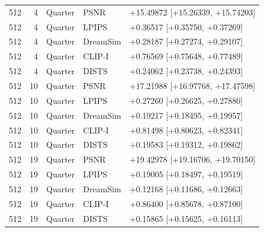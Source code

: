 \documentclass[10pt,letterpaper]{article}
\begin{document}
\begin{longtable}{@{}rrlll@{}}
512 & 4 & Quarter & PSNR & +15.49872 [+15.26339, +15.74203]\\
512 & 4 & Quarter & LPIPS & +0.36517 [+0.35750, +0.37269]\\
512 & 4 & Quarter & DreamSim & +0.28187 [+0.27274, +0.29107]\\
512 & 4 & Quarter & CLIP-I & +0.76569 [+0.75648, +0.77489]\\
512 & 4 & Quarter & DISTS & +0.24062 [+0.23738, +0.24393]\\
512 & 10 & Quarter & PSNR & +17.21988 [+16.97768, +17.47598]\\
512 & 10 & Quarter & LPIPS & +0.27260 [+0.26625, +0.27880]\\
512 & 10 & Quarter & DreamSim & +0.19217 [+0.18495, +0.19957]\\
512 & 10 & Quarter & CLIP-I & +0.81498 [+0.80623, +0.82341]\\
512 & 10 & Quarter & DISTS & +0.19583 [+0.19312, +0.19862]\\
512 & 19 & Quarter & PSNR & +19.42978 [+19.16706, +19.70150]\\
512 & 19 & Quarter & LPIPS & +0.19005 [+0.18497, +0.19519]\\
512 & 19 & Quarter & DreamSim & +0.12168 [+0.11686, +0.12663]\\
512 & 19 & Quarter & CLIP-I & +0.86400 [+0.85678, +0.87100]\\
512 & 19 & Quarter & DISTS & +0.15865 [+0.15625, +0.16113]\\
\bottomrule\end{longtable}
\end{document}
